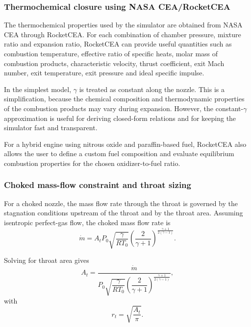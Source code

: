 \documentclass[11pt,a4paper]{article}
\begin{document}
\subsubsection{Thermochemical closure using NASA CEA/RocketCEA}

The thermochemical properties used by the simulator are obtained from NASA CEA through RocketCEA. For each combination of chamber pressure, mixture ratio and expansion ratio, RocketCEA can provide useful quantities such as combustion temperature, effective ratio of specific heats, molar mass of combustion products, characteristic velocity, thrust coefficient, exit Mach number, exit temperature, exit pressure and ideal specific impulse.

In the simplest model, $\gamma$ is treated as constant along the nozzle. This is a simplification, because the chemical composition and thermodynamic properties of the combustion products may vary during expansion. However, the constant-$\gamma$ approximation is useful for deriving closed-form relations and for keeping the simulator fast and transparent.

For a hybrid engine using nitrous oxide and paraffin-based fuel, RocketCEA also allows the user to define a custom fuel composition and evaluate equilibrium combustion properties for the chosen oxidizer-to-fuel ratio.

\subsubsection{Choked mass-flow constraint and throat sizing}

For a choked nozzle, the mass flow rate through the throat is governed by the stagnation conditions upstream of the throat and by the throat area. Assuming isentropic perfect-gas flow, the choked mass flow rate is
\begin{equation}
\dot{m}=A_t P_0
\sqrt{\frac{\gamma}{R T_0}}
\left(\frac{2}{\gamma+1}\right)^{\frac{\gamma+1}{2(\gamma-1)}} .
\label{eq:choked_mdot}
\end{equation}

Solving for throat area gives
\begin{equation}
A_t =
\frac{\dot{m}}{P_0
\sqrt{\dfrac{\gamma}{R T_0}}
\left(\dfrac{2}{\gamma+1}\right)^{\frac{\gamma+1}{2(\gamma-1)}}} ,
\label{eq:throat_area}
\end{equation}
with
\begin{equation}
r_t=\sqrt{\frac{A_t}{\pi}} .
\label{eq:throat_radius}
\end{equation}
\end{document}
